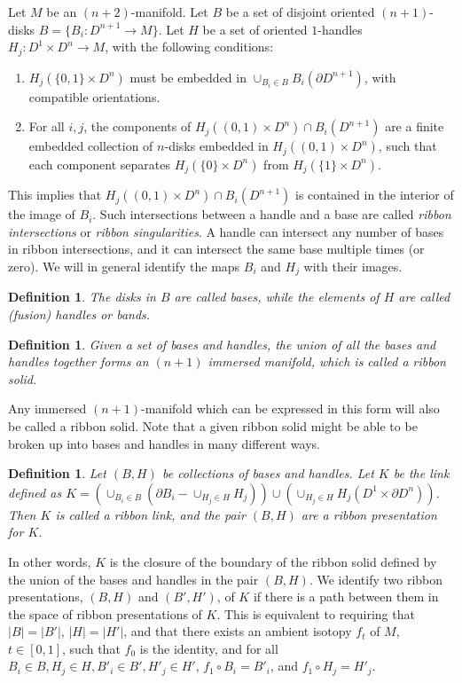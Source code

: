 \documentclass{amsart}
\newtheorem{definition}[theorem]{Definition}
\begin{document}
Let $M$ be an $(n+2)$-manifold. Let $B$ be a set of disjoint oriented $(n+1)$-disks $B=\{B_{i}:D^{n+1}\rightarrow M\}$. Let $H$ be a set of oriented $1$-handles $H_{j}: D^1\times D^n\rightarrow M$, with the following conditions:
\begin{enumerate}
	\item $H_j(\{ 0,1\}\times D^n)$ must be embedded in $\cup_{B_i\in B}B_i(\partial D^{n+1})$, with compatible orientations.
	\item For all $i, j$, the components of $H_j((0,1)\times D^n)\cap B_i(D^{n+1})$ are a finite embedded collection of $n$-disks embedded in $H_j((0,1)\times D^n)$, such that each component separates $H_j(\{0\}\times D^n)$ from $H_j(\{1\}\times D^n)$.
\end{enumerate}

This implies that $H_j((0,1)\times D^n)\cap B_i(D^{n+1})$ is contained in the interior of the image of $B_i$. Such intersections between a handle and a base are called \emph{ribbon intersections} or \emph{ribbon singularities}. A handle can intersect any number of bases in ribbon intersections, and it can intersect the same base multiple times (or zero). We will in general identify the maps $B_i$ and $H_j$ with their images.
\begin{definition}
The disks in $B$ are called \emph{bases}, while the elements of $H$ are called \emph{(fusion) handles} or \emph{bands}.
\end{definition}
\begin{definition}
Given a set of bases and handles, the union of all the bases and handles together forms an $(n+1)$ immersed manifold, which is called a \emph{ribbon solid}.
\end{definition}
Any immersed $(n+1)$-manifold which can be expressed in this form will also be called a ribbon solid. Note that a given ribbon solid might be able to be broken up into bases and handles in many different ways.

\begin{definition}
Let $(B, H)$ be collections of bases and handles. Let $K$ be the link defined as $K=({\cup}_{B_i\in B}(\partial B_{i}-{\cup}_{H_j\in H}H_{j}))\cup({\cup}_{H_j\in H}H_{j}(D^1\times\partial D^n))$. Then $K$ is called a \emph{ribbon link}, and the pair $(B, H)$ are a \emph{ribbon presentation} for $K$.
\end{definition}

In other words, $K$ is the closure of the boundary of the ribbon solid defined by the union of the bases and handles in the pair $(B, H)$. We identify two ribbon presentations, $(B, H)$ and $(B', H')$, of $K$ if there is a path between them in the space of ribbon presentations of $K.$ This is equivalent to requiring that $|B|=|B'|$, $|H|=|H'|$, and that there exists an ambient isotopy $f_t$ of $M$, $t\in [0,1]$, such that $f_0$ is the identity, and for all $B_i\in B, H_j\in H, B'_i\in B', H'_j\in H'$, $f_1\circ B_i=B'_i$, and $f_1\circ H_j=H'_j$.
\end{document}
